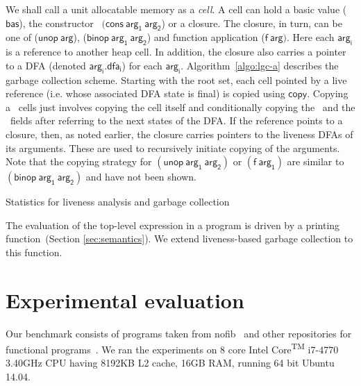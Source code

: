 \documentclass[9pt]{sigplanconf}
\begin{document}
We shall call a  unit allocatable memory as a {\em  cell}.  A cell can
hold    a    basic    value    ($\mathsf{bas}$),    the    constructor
\CONS\ $(\mathsf{cons~  arg_1~arg_2}$) or a closure.   The closure, in
turn,    can    be    one   of    ($\mathsf{unop~arg}$),    ($\mathsf{
  binop~arg_1~arg_2}$)  and  function application  ($\mathsf{f~arg})$.
Here each $\mathsf{  arg_i}$ is a reference to another  heap cell.  In
addition, the closure also carries  a pointer to a DFA (denoted
$\mathsf{arg_i.dfa_i}$) for each $\mathsf{arg_i}$.
Algorithm~\ref{algo:lgc-a}   describes   the   garbage
collection scheme.  Starting with the root set, each cell pointed by a
live reference  (i.e. whose associated  DFA state is final)  is copied
using $\mathsf{copy}$.   Copying a \CONS\ cells  just involves copying
the  cell  itself   and  conditionally  copying  the   \CAR\  and  the
\CDR\ fields after referring to the  next states of the DFA.  If
the reference points to a closure, then, as noted earlier, the closure
carries pointers  to the liveness  DFAs of its  arguments.  These
are  used to recursively  initiate copying of  the arguments.
Note that  the copying  strategy for  $\mathsf{(unop~arg_1~arg_2)}$ or
$\mathsf{(f~arg_1)}$ are similar to $\mathsf{(binop~arg_1~arg_2)}$ and
have not been shown.



\begin{table*}[t!]
\caption{Statistics for liveness analysis and garbage collection}
\label{tab:exp-results}
\centering

\vskip -5mm

\vskip -5mm
\end{table*} 

The evaluation of  the top-level expression in a program  is driven by
a printing function~(Section
\ref{sec:semantics}).  
We extend liveness-based  garbage  collection  to
this function.
\section{Experimental evaluation}
\label{sec:experiments}
Our benchmark consists of programs taken from nofib~\cite{nofib} and
other repositories for functional programs~\cite{PLT-Scheme,
  gc_bench, huffman-sicp}.  We ran the experiments on 8 core Intel\textsuperscript{\textregistered} Core\textsuperscript{TM}
i7-4770 3.40GHz CPU having 8192KB L2 cache, 16GB RAM, running 64 bit
Ubuntu 14.04.
\end{document}
